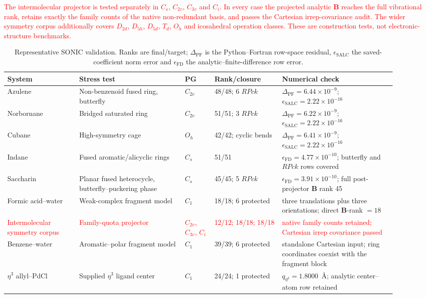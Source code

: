 \documentclass[journal=jctcce,manuscript=article,layout=traditional]{achemso}
\newcommand{\Bmat}{\mathbf{B}}
\theoremstyle{definition}
\begin{document}
\textcolor{red}{The intermolecular projector is tested separately in
\(C_s\), \(C_{2v}\), \(C_{3v}\) and \(C_i\).  In every case the projected
analytic \(\Bmat\) reaches the full vibrational rank, retains exactly the
family counts of the native non-redundant basis, and passes the Cartesian
irrep-covariance audit.  The wider symmetry corpus additionally covers
\(D_{2d}\), \(D_{5h}\), \(D_{5d}\), \(T_d\), \(O_h\) and icosahedral
operation classes.  These are construction tests, not electronic-structure
benchmarks.}
\begin{table}[htbp]
\centering
\scriptsize
\setlength{\tabcolsep}{3pt}
\caption{Representative SONIC validation.  Ranks are final/target;
\(\Delta_\mathrm{PF}\) is the Python--Fortran row-space residual,
\(\epsilon_\mathrm{SALC}\) the saved-coefficient norm error and
\(\epsilon_\mathrm{FD}\) the analytic--finite-difference row error.}
\label{tab:validation}
\begin{tabular}{@{}p{0.17\linewidth}p{0.25\linewidth}p{0.07\linewidth}p{0.16\linewidth}p{0.27\linewidth}@{}}
\toprule
System & Stress test & PG & Rank/closure & Numerical check \\
\midrule
Azulene & Non-benzenoid fused ring, butterfly & \(C_{2v}\) & 48/48; 6 \(RPck\) & \(\Delta_\mathrm{PF}=6.44\times10^{-9}\); \(\epsilon_\mathrm{SALC}=2.22\times10^{-16}\) \\
\midrule
Norbornane & Bridged saturated ring & \(C_{2v}\) & 51/51; 3 \(RPck\) & \(\Delta_\mathrm{PF}=6.22\times10^{-9}\); \(\epsilon_\mathrm{SALC}=2.22\times10^{-16}\) \\
\midrule
Cubane & High-symmetry cage & \(O_h\) & 42/42; cyclic bends & \(\Delta_\mathrm{PF}=6.41\times10^{-9}\); \(\epsilon_\mathrm{SALC}=2.22\times10^{-16}\) \\
\midrule
Indane & Fused aromatic/alicyclic rings & \(C_s\) & 51/51 & \(\epsilon_\mathrm{FD}=4.77\times10^{-10}\); butterfly and \(RPck\) rows covered \\
\midrule
Saccharin & Planar fused heterocycle, butterfly--puckering phase & \(C_s\) & 45/45; 5 \(RPck\) & \(\epsilon_\mathrm{FD}=3.91\times10^{-10}\); full post-projector \(\Bmat\) rank 45 \\
\midrule
Formic acid--water & Weak-complex fragment model & \(C_1\) & 18/18; 6 protected & three translations plus three orientations; direct \(\Bmat\)-rank \(=18\) \\
\midrule
\textcolor{red}{Intermolecular symmetry corpus} &
\textcolor{red}{Family-quota projector} &
\textcolor{red}{\(C_{2v}\), \(C_{3v}\), \(C_i\)} &
\textcolor{red}{12/12; 18/18; 18/18} &
\textcolor{red}{native family counts retained; Cartesian irrep covariance passed} \\
\midrule
Benzene--water & Aromatic--polar fragment model & \(C_1\) & 39/39; 6 protected & standalone Cartesian input; ring coordinates coexist with the fragment block \\
\midrule
$\eta^3$ allyl--PdCl & Supplied $\eta^3$ ligand center & \(C_1\) & 24/24; 1 protected & \(q_{\eta^3}=1.8000\)~\AA; analytic center--atom row retained \\
\bottomrule
\end{tabular}
\end{table}
\end{document}
